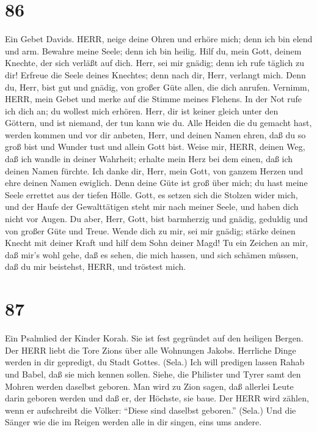 \hypertarget{section-85}{%
\section{86}\label{section-85}}

 Ein Gebet Davids. HERR, neige deine Ohren und erhöre mich;
denn ich bin elend und arm.  Bewahre meine Seele; denn ich
bin heilig. Hilf du, mein Gott, deinem Knechte, der sich verläßt auf
dich.  Herr, sei mir gnädig; denn ich rufe täglich zu dir!
 Erfreue die Seele deines Knechtes; denn nach dir, Herr,
verlangt mich.  Denn du, Herr, bist gut und gnädig, von
großer Güte allen, die dich anrufen.  Vernimm, HERR, mein
Gebet und merke auf die Stimme meines Flehens.  In der Not
rufe ich dich an; du wollest mich erhören.  Herr, dir ist
keiner gleich unter den Göttern, und ist niemand, der tun kann wie du.
 Alle Heiden die du gemacht hast, werden kommen und vor dir
anbeten, Herr, und deinen Namen ehren,  daß du so groß bist
und Wunder tust und allein Gott bist.  Weise mir, HERR,
deinen Weg, daß ich wandle in deiner Wahrheit; erhalte mein Herz bei dem
einen, daß ich deinen Namen fürchte.  Ich danke dir, Herr,
mein Gott, von ganzem Herzen und ehre deinen Namen ewiglich.
 Denn deine Güte ist groß über mich; du hast meine Seele
errettet aus der tiefen Hölle.  Gott, es setzen sich die
Stolzen wider mich, und der Haufe der Gewalttätigen steht mir nach
meiner Seele, und haben dich nicht vor Augen.  Du aber,
Herr, Gott, bist barmherzig und gnädig, geduldig und von großer Güte und
Treue.  Wende dich zu mir, sei mir gnädig; stärke deinen
Knecht mit deiner Kraft und hilf dem Sohn deiner Magd!  Tu
ein Zeichen an mir, daß mir's wohl gehe, daß es sehen, die mich hassen,
und sich schämen müssen, daß du mir beistehst, HERR, und tröstest mich.

\hypertarget{section-86}{%
\section{87}\label{section-86}}

 Ein Psalmlied der Kinder Korah. Sie ist fest gegründet auf
den heiligen Bergen.  Der HERR liebt die Tore Zions über
alle Wohnungen Jakobs.  Herrliche Dinge werden in dir
gepredigt, du Stadt Gottes. (Sela.)  Ich will predigen
lassen Rahab und Babel, daß sie mich kennen sollen. Siehe, die Philister
und Tyrer samt den Mohren werden daselbst geboren.  Man wird
zu Zion sagen, daß allerlei Leute darin geboren werden und daß er, der
Höchste, sie baue.  Der HERR wird zählen, wenn er
aufschreibt die Völker: ``Diese sind daselbst geboren.'' (Sela.)
 Und die Sänger wie die im Reigen werden alle in dir singen,
eins ums andere.

